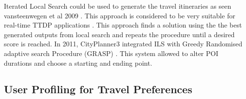     Iterated Local Search could be used to generate the travel
    itineraries as seen vansteenwegen et al 2009
    \cite{Vansteenwegen2009}. This approach is considered to be very
    suitable for real-time TTDP applications \cite{Gavalas2015}. This
    approach finds a solution using the the best generated outputs
    from local search and repeats the procedure until a desired score
    is reached. In 2011, CityPlanner3 \cite{Vansteenwegen2011a}
    integrated ILS with Greedy Randomised adaptive search Procedure
    (GRASP) \cite{Feo1995}. This system allowed to alter POI durations and choose a
    starting and ending point.




\subsection{User Profiling for Travel Preferences}
 